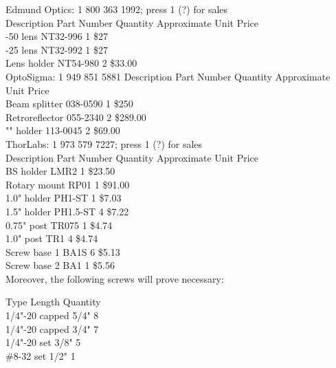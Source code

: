 Edmund Optics: 1 800 363 1992; press 1 (?) for sales \\
Description     Part Number     Quantity   Approximate Unit Price\\
-50 lens        NT32-996        1          \$27 \\
-25 lens        NT32-992        1          \$27 \\
Lens holder     NT54-980        2          \$33.00\\

OptoSigma: 1 949 851 5881 
Description     Part Number     Quantity   Approximate Unit Price\\
Beam splitter   038-0590        1          \$250\\
Retroreflector  055-2340        2          \$289.00\\
"" holder       113-0045        2          \$69.00\\

ThorLabs: 1 973 579 7227; press 1 (?) for sales\\
Description     Part Number     Quantity   Approximate Unit Price\\
BS holder       LMR2            1          \$23.50\\
Rotary mount    RP01            1          \$91.00 \\
1.0" holder     PH1-ST          1          \$7.03\\
1.5" holder     PH1.5-ST        4          \$7.22\\
0.75" post      TR075           1          \$4.74 \\
1.0" post       TR1             4          \$4.74 \\
Screw base 1    BA1S            6          \$5.13\\
Screw base 2    BA1             1          \$5.56 \\

Moreover, the following screws will prove necessary:

Type            Length          Quantity\\
1/4"-20 capped  5/4"            8\\
1/4"-20 capped  3/4"            7\\
1/4"-20 set     3/8"            5\\
\#8-32   set     1/2"            1\\

